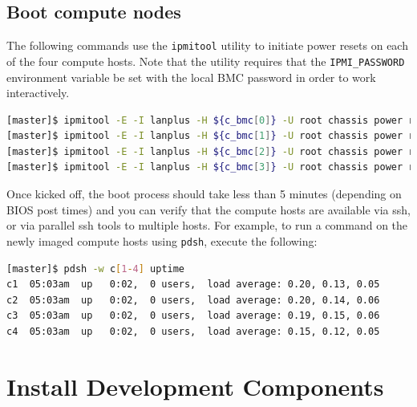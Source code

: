 \documentclass[letterpaper]{article}
\begin{document}

\subsection{Boot compute nodes} \label{sec:boot_computes}

 
The following commands use the \texttt{ipmitool} utility to initiate power
resets on each of the four compute hosts. Note that the utility requires that
the \texttt{IPMI\_PASSWORD} environment variable be set with the local BMC password in
order to work interactively.


\begin{lstlisting}[language=bash,keywords={},upquote=true]
[master]$ ipmitool -E -I lanplus -H ${c_bmc[0]} -U root chassis power reset   # power cycle c1
[master]$ ipmitool -E -I lanplus -H ${c_bmc[1]} -U root chassis power reset   # power cycle c2
[master]$ ipmitool -E -I lanplus -H ${c_bmc[2]} -U root chassis power reset   # power cycle c3
[master]$ ipmitool -E -I lanplus -H ${c_bmc[3]} -U root chassis power reset   # power cycle c4
\end{lstlisting} 

Once kicked off, the boot process should take less than 5 minutes (depending on
BIOS post times) and you can verify that the compute hosts are available via
ssh, or via parallel ssh tools to multiple hosts. For example, to run a command
on the newly imaged compute hosts using \texttt{pdsh}, execute the following:

\begin{lstlisting}[language=bash]
[master]$ pdsh -w c[1-4] uptime
c1  05:03am  up   0:02,  0 users,  load average: 0.20, 0.13, 0.05
c2  05:03am  up   0:02,  0 users,  load average: 0.20, 0.14, 0.06
c3  05:03am  up   0:02,  0 users,  load average: 0.19, 0.15, 0.06
c4  05:03am  up   0:02,  0 users,  load average: 0.15, 0.12, 0.05
\end{lstlisting}



\section{Install \FSP{} Development Components}
\end{document}
